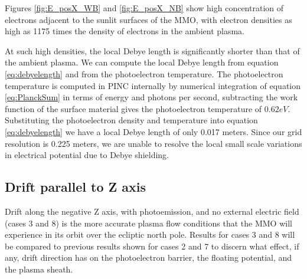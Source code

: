 Figures \ref{fig:E_posX_WB} and \ref{fig:E_posX_NB} show high concentration of electrons adjacent to the sunlit surfaces of the MMO, with electron densities as high as 1175 times the density of electrons in the ambient plasma. 

At such high densities, the local Debye length is significantly shorter than that of the ambient plasma. We can compute the local Debye length from equation \eqref{eq:debyelength} and from the photoelectron temperature. The photoelectron temperature is computed in PINC internally by numerical integration of equation \eqref{eq:PlanckSum} in terms of energy and photons per second, subtracting the work function of the surface material gives the photoelectron temperature of $0.62 eV$. Substituting the photoelectron density and temperature into equation \eqref{eq:debyelength} we have a local Debye length of only 0.017 meters. Since our grid resolution is 0.225 meters, we are unable to resolve the local small scale variations in electrical potential due to Debye shielding.

\subsection*{Drift parallel to Z axis}
Drift along the negative Z axis, with photoemission, and no external electric field (cases 3 and 8) is the more accurate plasma flow conditions that the MMO will experience in its orbit over the ecliptic north pole. Results for cases 3 and 8 will be compared to previous results shown for cases  2 and 7 to discern what effect, if any, drift direction has on the photoelectron barrier, the floating potential, and the plasma sheath. 

